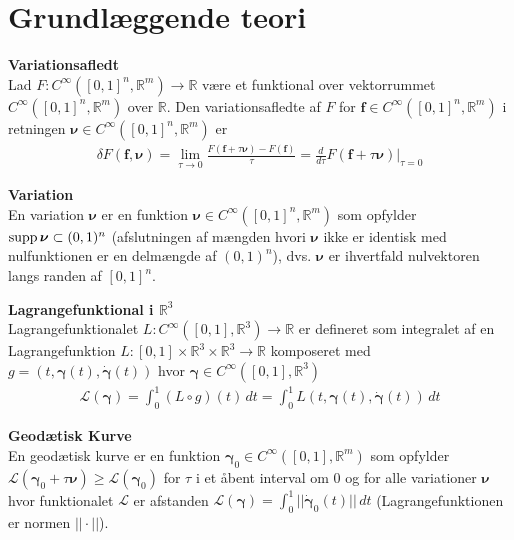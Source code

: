 \section{Grundlæggende teori}
\begin{dfn} {\bf Variationsafledt}\\
Lad $F : C^\infty ([0,1]^n, \mathbb{R}^m) \to \mathbb{R}$ være et funktional over vektorrummet $C^\infty([0,1]^n, \mathbb{R}^m)$ over $\mathbb{R}$. Den variationsafledte af $F$ for $\mathbf{f}\in C^\infty ([0,1]^n, \mathbb{R}^m)$ i retningen ${\boldsymbol \nu}\in C^\infty ([0,1]^n, \mathbb{R}^m)$ er
\begin{align*}
\delta F(\mathbf{f}, {\boldsymbol \nu}) = \lim_{\tau \to 0} \frac{F(\mathbf{f}+\tau{\boldsymbol \nu})-F(\mathbf{f})}{\tau} = \frac{d}{d\tau} F(\mathbf{f}+\tau {\boldsymbol \nu}) \Big|_{\tau = 0}
\end{align*}
\end{dfn}


\begin{dfn} {\bf Variation}\\
En variation ${\boldsymbol \nu}$ er en funktion ${\boldsymbol \nu} \in C^\infty ([0,1]^n, \mathbb{R}^m)$ som opfylder $\textnormal{supp}\, {\boldsymbol \nu} \subset (0,1)^n$ (afslutningen af mængden hvori ${\boldsymbol \nu}$ ikke er identisk med nulfunktionen er en delmængde af $ (0,1)^n$), dvs. ${\boldsymbol \nu}$ er ihvertfald nulvektoren langs randen af $[0,1]^n$.
\end{dfn}


\begin{dfn} {\bf Lagrangefunktional i $\mathbb{R}^3$}\\
Lagrangefunktionalet $L : C^\infty ([0,1], \mathbb{R}^3) \to \mathbb{R}$ er defineret som integralet af en Lagrangefunktion $ L : [0,1] \times \mathbb{R}^3 \times \mathbb{R}^3 \to \mathbb{R}$ komposeret med $g=(t,{\boldsymbol \gamma}(t),\dot{\boldsymbol \gamma}(t))$ hvor ${\boldsymbol \gamma} \in C^\infty ([0,1], \mathbb{R}^3)$
\begin{align*}
\mathscr{L}({\boldsymbol \gamma})= \int_0^1 ( L\circ g)(t) \, dt =\int_0^1  L(t, {\boldsymbol \gamma}(t),\dot{{\boldsymbol \gamma}}(t)) \, dt
\end{align*}
\end{dfn}

\begin{dfn} {\bf Geodætisk Kurve}\\
En geodætisk kurve er en funktion ${\boldsymbol \gamma}_0 \in C^\infty ([0,1],\mathbb{R}^m)$ som opfylder $\mathscr{L}({\boldsymbol \gamma}_0+\tau {\boldsymbol \nu}) \geq \mathscr{L}({\boldsymbol \gamma}_0)$ for $\tau$ i et åbent interval om $0$ og for alle variationer ${\boldsymbol \nu}$ hvor funktionalet $\mathscr{L}$ er afstanden $\mathscr{L}({\boldsymbol \gamma})=\int^1_0 ||\dot{\boldsymbol \gamma}_0(t)|| \, dt$ (Lagrangefunktionen er normen $||\cdot||$).
\end{dfn}


